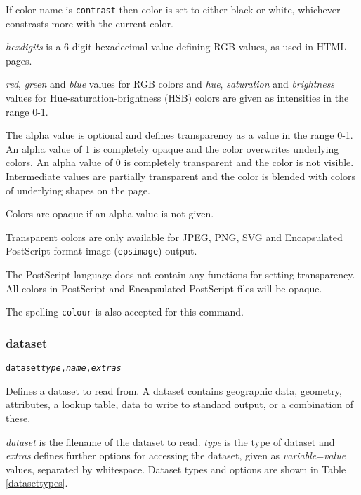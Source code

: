 If color name is \texttt{contrast} then color is set to either black or white,
whichever constrasts more with the current color.

\textit{hexdigits} is a 6 digit hexadecimal
value defining RGB values, as used in HTML pages.

\textit{red}, \textit{green} and \textit{blue} values for RGB colors and
\textit{hue}, \textit{saturation} and \textit{brightness} values for
Hue-saturation-brightness (HSB) colors are given as intensities in the range
0-1.

The alpha value is optional and defines transparency as a value in the range
0-1.  An alpha value of 1 is completely opaque and the color overwrites
underlying colors.  An alpha value of 0 is completely transparent and the color
is not visible.  Intermediate values are partially transparent and the color is
blended with colors of underlying shapes on the page.

Colors are opaque if an alpha value is not given.

Transparent colors are only available for JPEG, PNG, SVG
and Encapsulated PostScript format image (\texttt{epsimage}) output.

The PostScript language does not contain any functions for setting
transparency.
All colors in PostScript and Encapsulated PostScript
files will be opaque.

The spelling \texttt{colour} is also accepted for this command.

\subsubsection{dataset}

\begin{alltt}
dataset \textit{type}, \textit{name}, \textit{extras}
\end{alltt}

Defines a dataset to read from.  A dataset contains geographic data,
geometry, attributes, a lookup table, data to write to standard
output, or a combination of these.

\textit{dataset} is the filename of the dataset to read.
\textit{type} is the type of dataset and
\textit{extras} defines further options for accessing the dataset, given
as \textit{variable=value} values, separated by whitespace.
Dataset types and options are shown in Table \ref{datasettypes}.



